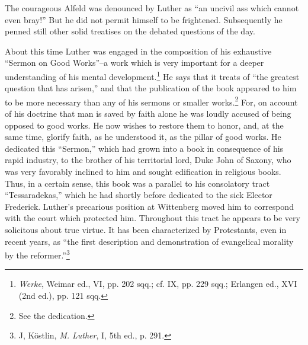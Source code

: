 The courageous Alfeld was denounced by Luther as “an uncivil
ass which cannot even bray!” But he did not permit himself to be
frightened. Subsequently he penned still other solid treatises on the
debated questions of the day.

About this time Luther was engaged in the composition of his
exhaustive “Sermon on Good Works”--a work which is very important for a
deeper understanding of his mental development.\footnote
{\textit{Werke}, Weimar ed., VI, pp. 202 sqq.; cf. IX, pp. 229 sqq.; Erlangen ed., XVI (2nd ed.),
pp. 121 sqq.}
He says that it treats of “the greatest question that has arisen,” and that
the publication of the book appeared to him to be more necessary
than any of his sermons or smaller works.\footnote{See the dedication.}
For, on account of his doctrine that man is saved by faith alone he was loudly accused of
being opposed to good works. He now wishes to restore them to
honor, and, at the same time, glorify faith, as he understood it, as
the pillar of good works. He dedicated this “Sermon,” which had
grown into a book in consequence of his rapid industry, to the
brother of his territorial lord, Duke John of Saxony, who was very favorably
inclined to him and sought edification in religious books. Thus,
in a certain sense, this book was a parallel to his consolatory tract
“Tessaradekas,” which he had shortly before dedicated to the sick
Elector Frederick. Luther’s precarious position at Wittenberg moved
him to correspond with the court which protected him. Throughout
this tract he appears to be very solicitous about true virtue. It has
been characterized by Protestants, even in recent years, as “the first
description and demonstration of evangelical morality by the reformer.”\footnote
{J, Köstlin, \textit{M. Luther}, I, 5th ed., p. 291.}

